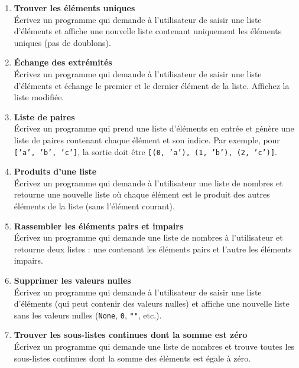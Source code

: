 

\begin{enumerate}

    \item \textbf{Trouver les éléments uniques} \\
    Écrivez un programme qui demande à l'utilisateur de saisir une liste d'éléments et affiche une nouvelle liste contenant uniquement les éléments uniques (pas de doublons).

    \item \textbf{Échange des extrémités} \\
    Écrivez un programme qui demande à l'utilisateur de saisir une liste d'éléments et échange le premier et le dernier élément de la liste. Affichez la liste modifiée.

    \item \textbf{Liste de paires} \\
    Écrivez un programme qui prend une liste d'éléments en entrée et génère une liste de paires contenant chaque élément et son indice. Par exemple, pour \texttt{['a', 'b', 'c']}, la sortie doit être \texttt{[(0, 'a'), (1, 'b'), (2, 'c')]}.

    \item \textbf{Produits d'une liste} \\
    Écrivez un programme qui demande à l'utilisateur une liste de nombres et retourne une nouvelle liste où chaque élément est le produit des autres éléments de la liste (sans l'élément courant).

    \item \textbf{Rassembler les éléments pairs et impairs} \\
    Écrivez un programme qui demande une liste de nombres à l'utilisateur et retourne deux listes : une contenant les éléments pairs et l'autre les éléments impairs.

    \item \textbf{Supprimer les valeurs nulles} \\
    Écrivez un programme qui demande à l'utilisateur de saisir une liste d'éléments (qui peut contenir des valeurs nulles) et affiche une nouvelle liste sans les valeurs nulles (\texttt{None}, \texttt{0}, \texttt{""}, etc.).

    \item \textbf{Trouver les sous-listes continues dont la somme est zéro} \\
    Écrivez un programme qui demande une liste de nombres et trouve toutes les sous-listes continues dont la somme des éléments est égale à zéro.


\end{enumerate}
